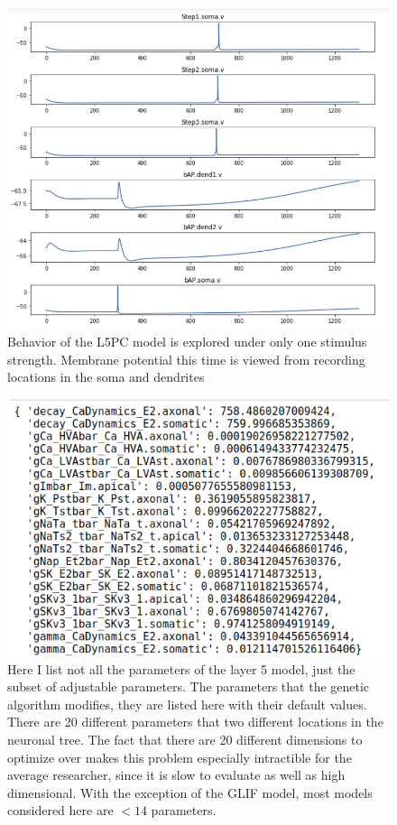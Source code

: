 \begin{figure}
    \centering
    \includegraphics{figures/l5pc}
    \caption[Behavior of the L5PC model under optimized parameters]{Behavior of the L5PC model is explored under only one stimulus strength. Membrane potential this time is viewed from recording locations in the soma and dendrites}
    \label{fig:after_optimization}
\end{figure}

\begin{figure}
    \centering
    \includegraphics{figures/parameters_opt_l5pc.png}
    \caption[Subset of modal parameters eligible for tuning in L5PC neuron]{Here I list not all the parameters of the layer 5 model, just the subset of adjustable parameters. The parameters that the genetic algorithm modifies, they are listed here with their default values. There are 20 different parameters that two different locations in the neuronal tree. The fact that there are 20 different dimensions to optimize over makes this problem especially intractible for the average researcher, since it is slow to evaluate as well as high dimensional. With the exception of the GLIF model, most models considered here are $<14$ parameters.}
    \label{fig:ca1_parameters}
\end{figure}



